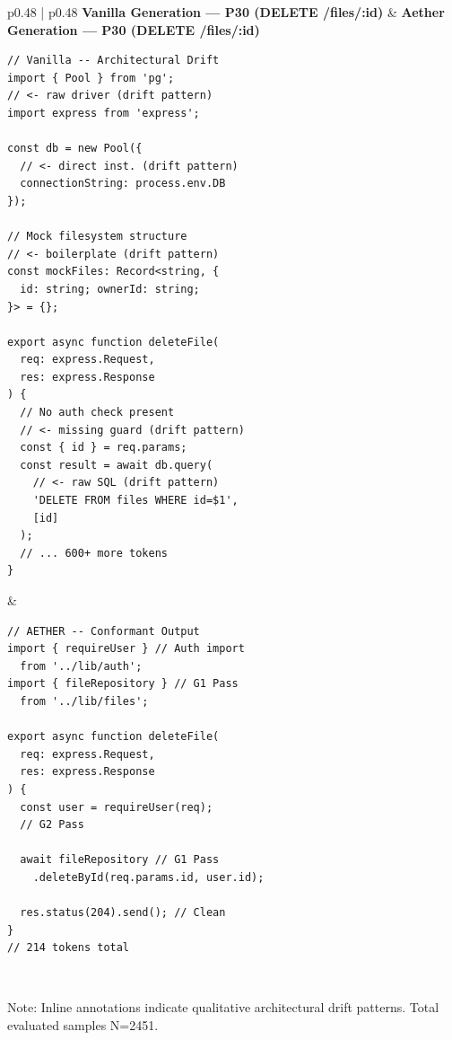 \begin{table}[htbp]
\centering
\caption{Side-by-side comparison of generated implementations for prompt P30 (DELETE /files/:id), demonstrating qualitative architectural drift patterns in Vanilla vs. target conformance in Aether.}
\label{tab:code_example}
\begin{tabular}{p{} | p{}}
\toprule
\textbf{Vanilla Generation --- P30 (DELETE /files/:id)} & \textbf{Aether Generation --- P30 (DELETE /files/:id)} \\
\midrule
\begin{minipage}[t]{0.48\textwidth}
\scriptsize
\begin{verbatim}
// Vanilla -- Architectural Drift
import { Pool } from 'pg';
// <- raw driver (drift pattern)
import express from 'express';

const db = new Pool({
  // <- direct inst. (drift pattern)
  connectionString: process.env.DB
});

// Mock filesystem structure
// <- boilerplate (drift pattern)
const mockFiles: Record<string, {
  id: string; ownerId: string;
}> = {};

export async function deleteFile(
  req: express.Request,
  res: express.Response
) {
  // No auth check present
  // <- missing guard (drift pattern)
  const { id } = req.params;
  const result = await db.query(
    // <- raw SQL (drift pattern)
    'DELETE FROM files WHERE id=$1',
    [id]
  );
  // ... 600+ more tokens
}
\end{verbatim}
\end{minipage}
&
\begin{minipage}[t]{0.48\textwidth}
\scriptsize
\begin{verbatim}
// AETHER -- Conformant Output
import { requireUser } // Auth import
  from '../lib/auth';
import { fileRepository } // G1 Pass
  from '../lib/files';

export async function deleteFile(
  req: express.Request,
  res: express.Response
) {
  const user = requireUser(req);
  // G2 Pass

  await fileRepository // G1 Pass
    .deleteById(req.params.id, user.id);

  res.status(204).send(); // Clean
}
// 214 tokens total
\end{verbatim}
\end{minipage} \\
\bottomrule
\end{tabular}
\begin{flushleft}
\footnotesize{Note: Inline annotations indicate qualitative architectural drift patterns. Total evaluated samples N=2451.}
\end{flushleft}
\end{table}

